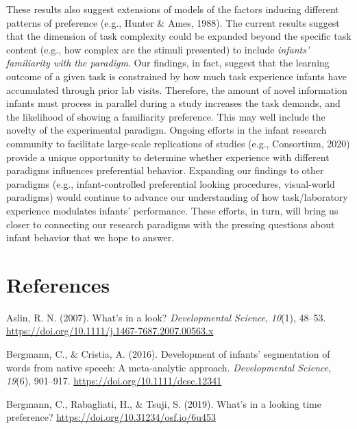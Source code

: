\documentclass[english,man,man,floatsintext]{apa6}
\begin{document}
These results also suggest extensions of models of the factors inducing different patterns of preference (e.g., Hunter \& Ames, 1988). The current results suggest that the dimension of task complexity could be expanded beyond the specific task content (e.g., how complex are the stimuli presented) to include \emph{infants' familiarity with the paradigm}. Our findings, in fact, suggest that the learning outcome of a given task is constrained by how much task experience infants have accumulated through prior lab visits. Therefore, the amount of novel information infants must process in parallel during a study increases the task demands, and the likelihood of showing a familiarity preference. This may well include the novelty of the experimental paradigm. Ongoing efforts in the infant research community to facilitate large-scale replications of studies (e.g., Consortium, 2020) provide a unique opportunity to determine whether experience with different paradigms influences preferential behavior. Expanding our findings to other paradigms (e.g., infant-controlled preferential looking procedures, visual-world paradigms) would continue to advance our understanding of how task/laboratory experience modulates infants' performance. These efforts, in turn, will bring us closer to connecting our research paradigms with the pressing questions about infant behavior that we hope to answer.

\newpage

\hypertarget{references}{%
\section{References}\label{references}}

\begingroup
\setlength{\parindent}{-0.5in}
\setlength{\leftskip}{0.5in}

\hypertarget{refs}{}
\leavevmode\hypertarget{ref-aslin2007}{}%
Aslin, R. N. (2007). What's in a look? \emph{Developmental Science}, \emph{10}(1), 48--53. \url{https://doi.org/10.1111/j.1467-7687.2007.00563.x}

\leavevmode\hypertarget{ref-bergmann2016}{}%
Bergmann, C., \& Cristia, A. (2016). Development of infants' segmentation of words from native speech: A meta-analytic approach. \emph{Developmental Science}, \emph{19}(6), 901--917. \url{https://doi.org/10.1111/desc.12341}

\leavevmode\hypertarget{ref-bergmann2019}{}%
Bergmann, C., Rabagliati, H., \& Tsuji, S. (2019). What's in a looking time preference? \url{https://doi.org/10.31234/osf.io/6u453}
\end{document}
